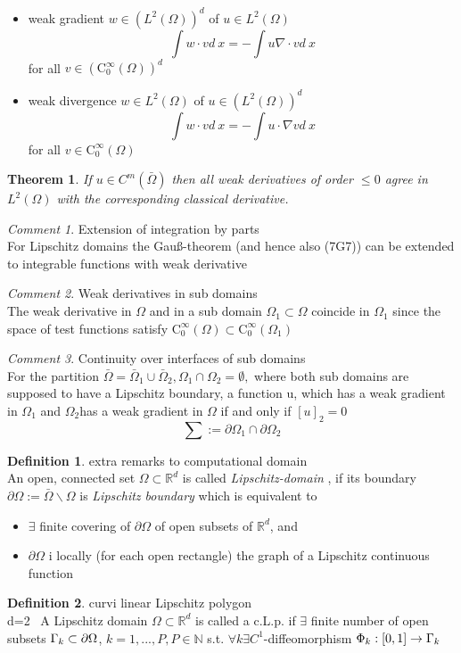 \documentclass[english]{article}
\newtheorem*{theorem}{Theorem}
\theoremstyle{definition}
\newtheorem*{defi}{Definition}
\theoremstyle{remark}
\newtheorem*{comm}{Comment}
\newcommand{\p}{\partial}
\newcommand{\NN}{\mathbb{N}}			%
\newcommand{\RR}{\mathbb{R}}			%
\newcommand{\OO}{\Omega}
\newcommand{\cinf}{\tx{C}^\infty}
\newcommand{\tx}[1]{\text{#1}}
\begin{document}
\begin{itemize}
\item weak gradient $w \in (L^2(\OO))^d$ of $u \in L^2(\OO)$
  $$\int w\cdot v d\ x = -\int u \nabla \cdot v d\ x$$
  for all $v \in (\cinf_0 (\OO))^d$
\item weak divergence $w\in L^2(\OO)$ of $u \in (L^2(\OO))^d$
  $$\int w\cdot v d\ x = -\int u \cdot\nabla  v d\ x$$
  for all $v \in \cinf_0(\OO)$
\end{itemize}
\begin{theorem}
  If $u \in C^m(\bar\OO)$ then all weak derivatives of order $\leq 0$ agree in $L^2(\OO)$ with the corresponding classical derivative.
\end{theorem}
\begin{comm}Extension of integration by parts\\

  For Lipschitz domains the Gau\ss{}-theorem (and hence also (7G7)) can be extended to integrable functions with weak derivative
\end{comm}
\begin{comm} Weak derivatives in sub domains\\
  The weak derivative in $\OO$ and in a sub domain $\OO_1 \subset \OO$ coincide in $\OO_1$ since the space of test functions satisfy $\cinf_0(\OO) \subset \cinf_0(\OO_1)$
\end{comm}
\begin{comm} Continuity over interfaces of sub domains\\
  For the partition $\bar\OO = \bar\OO_1 \cup \bar\OO_2, \OO_1\cap\OO_2=\emptyset,$ where both sub domains are supposed to have a Lipschitz boundary, a function u, which has a weak gradient in $\OO_1$ and $\OO_2$has a weak gradient in $\OO$ if and only if $[u]_2 = 0$ $$\sum:= \p \OO_1 \cap\p \OO_2$$
\end{comm}
\begin{defi} extra remarks to computational domain\\
  An open, connected set $\OO \subset \RR^d $ is called \emph{Lipschitz-domain} , if its boundary $\p\OO:=\bar\OO\backslash \OO$ is \emph{Lipschitz boundary} which is equivalent to 
  \begin{itemize}
  \item $\exists$ finite covering of $\p\OO$ of open subsets of $\RR^d$, and 
  \item $\p \OO$ i locally (for each open rectangle) the graph of a Lipschitz continuous function
  \end{itemize}
\end{defi}
\begin{defi}
  curvi linear Lipschitz polygon\\
  d=2 \ A Lipschitz domain $\OO\subset \RR^d$ is called a  c.L.p. if $\exists $ finite number of open subsets $\GG_k \subset \p \OO$, $k=1,...,P, P\in \NN$ s.t. $\forall k \exists C^1$-diffeomorphism $\Phi_k : [0,1] \to \Gamma_k$

\end{defi}
\end{document}
